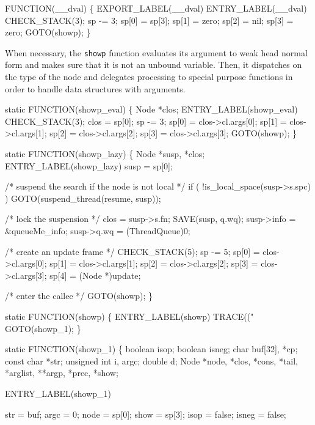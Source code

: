 FUNCTION(__dval)
\{
    EXPORT_LABEL(__dval)
 ENTRY_LABEL(__dval)
    CHECK_STACK(3);
    sp   -= 3;
    sp[0] = sp[3];
    sp[1] = zero;
    sp[2] = nil;
    sp[3] = zero;
    GOTO(showp);
\}

\nwendcode{}\nwdocspar
When necessary, the \texttt{showp} function evaluates its argument to
weak head normal form and makes sure that it is not an unbound
variable. Then, it dispatches on the type of the node and delegates
processing to special purpose functions in order to handle data
structures with arguments.

\nwenddocs{}\plusendmoddef\nwstartdeflinemarkup{}\nwenddeflinemarkup
static
FUNCTION(showp_eval)
\{
    Node *clos;
 ENTRY_LABEL(showp_eval)
    CHECK_STACK(3);
    clos  = sp[0];
    sp   -= 3;
    sp[0] = clos->cl.args[0];
    sp[1] = clos->cl.args[1];
    sp[2] = clos->cl.args[2];
    sp[3] = clos->cl.args[3];
    GOTO(showp);
\}

static
FUNCTION(showp_lazy)
\{
    Node *susp, *clos;
 ENTRY_LABEL(showp_lazy)
    susp = sp[0];

    /* suspend the search if the node is not local */
    if ( !is_local_space(susp->s.spc) )
        GOTO(suspend_thread(resume, susp));

    /* lock the suspension */
    clos = susp->s.fn;
    SAVE(susp, q.wq);
    susp->info = &queueMe_info;
    susp->q.wq = (ThreadQueue)0;

    /* create an update frame */
    CHECK_STACK(5);
    sp   -= 5;
    sp[0] = clos->cl.args[0];
    sp[1] = clos->cl.args[1];
    sp[2] = clos->cl.args[2];
    sp[3] = clos->cl.args[3];
    sp[4] = (Node *)update;

    /* enter the callee */
    GOTO(showp);
\}

static
FUNCTION(showp)
\{
 ENTRY_LABEL(showp)
    TRACE(("%
    GOTO(showp_1);
\}

static
FUNCTION(showp_1)
\{
    boolean      isop;
    boolean      isneg;
    char         buf[32], *cp;
    const char   *str;
    unsigned int i, argc;
    double       d;
    Node         *node, *clos, *cons, *tail, *arglist, **argp, *prec, *show;

 ENTRY_LABEL(showp_1)

    str   = buf;
    argc  = 0;
    node  = sp[0];
    show  = sp[3];
    isop  = false;
    isneg = false;


